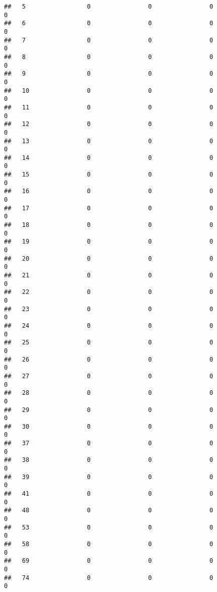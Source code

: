 \documentclass[]{article}
\begin{document}
\begin{verbatim}
##   5                 0                0                0                0
##   6                 0                0                0                0
##   7                 0                0                0                0
##   8                 0                0                0                0
##   9                 0                0                0                0
##   10                0                0                0                0
##   11                0                0                0                0
##   12                0                0                0                0
##   13                0                0                0                0
##   14                0                0                0                0
##   15                0                0                0                0
##   16                0                0                0                0
##   17                0                0                0                0
##   18                0                0                0                0
##   19                0                0                0                0
##   20                0                0                0                0
##   21                0                0                0                0
##   22                0                0                0                0
##   23                0                0                0                0
##   24                0                0                0                0
##   25                0                0                0                0
##   26                0                0                0                0
##   27                0                0                0                0
##   28                0                0                0                0
##   29                0                0                0                0
##   30                0                0                0                0
##   37                0                0                0                0
##   38                0                0                0                0
##   39                0                0                0                0
##   41                0                0                0                0
##   48                0                0                0                0
##   53                0                0                0                0
##   58                0                0                0                0
##   69                0                0                0                0
##   74                0                0                0                0

\end{verbatim}
\end{document}
